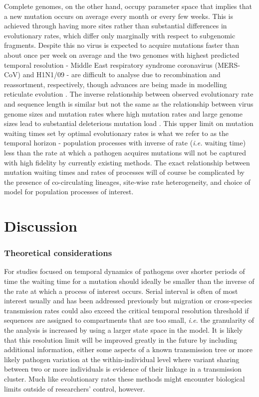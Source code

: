 \documentclass{bmcart}
\begin{document}
Complete genomes, on the other hand, occupy parameter space that implies that a new mutation occurs on average every month or every few weeks.
This is achieved through having more sites rather than substantial differences in evolutionary rates, which differ only marginally with respect to subgenomic fragments.
Despite this no virus is expected to acquire mutations faster than about once per week on average and the two genomes with highest predicted temporal resolution - Middle East respiratory syndrome coronavirus (MERS-CoV) and H1N1/09 - are difficult to analyse due to recombination and reassortment, respectively, though advances are being made in modelling reticulate evolution \cite{vaughan_inferring_2017}.
The inverse relationship between observed evolutionary rate and sequence length is similar but not the same as the relationship between virus genome sizes and mutation rates where high mutation rates and large genome sizes lead to substantial deleterious mutation load \cite{gago_extremely_2009}.
This upper limit on mutation waiting times set by optimal evolutionary rates is what we refer to as the temporal horizon - population processes with inverse of rate (\textit{i.e.} waiting time) less than the rate at which a pathogen acquires mutations will not be captured with high fidelity by currently existing methods.
The exact relationship between mutation waiting times and rates of processes will of course be complicated by the presence of co-circulating lineages, site-wise rate heterogeneity, and choice of model for population processes of interest.

\section*{Discussion}
\subsubsection*{Theoretical considerations}
For studies focused on temporal dynamics of pathogens over shorter periods of time the waiting time for a mutation should ideally be smaller than the inverse of the rate at which a process of interest occurs.
Serial interval is often of most interest usually and has been addressed previously \cite{campbell_when_2018,grubaugh_tracking_2019} but migration or cross-species transmission rates could also exceed the critical temporal resolution threshold if sequences are assigned to compartments that are too small, \textit{i.e.} the granularity of the analysis is increased by using a larger state space in the model.
It is likely that this resolution limit will be improved greatly in the future by including additional information, either some aspects of a known transmission tree or more likely pathogen variation at the within-individual level where variant sharing between two or more individuals is evidence of their linkage in a transmission cluster.
Much like evolutionary rates these methods might encounter biological limits outside of researchers' control, however.
\end{document}
